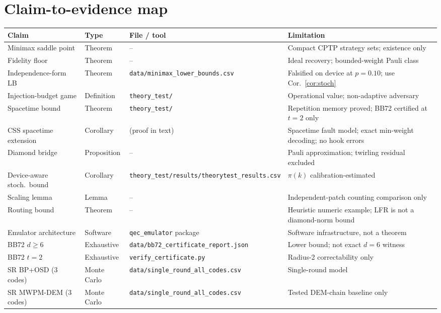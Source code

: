 \documentclass[11pt,a4paper]{article}
\begin{document}
\section*{Claim-to-evidence map}
\begin{table}[H]\centering\scriptsize
\setlength{\tabcolsep}{3pt}
\renewcommand{\arraystretch}{1.08}
\begin{tabularx}{\textwidth}{@{}p{3.1cm}p{1.7cm}X p{2.9cm}@{}}
\toprule Claim & Type & File / tool & Limitation \\\midrule
Minimax saddle point & Theorem & -- & Compact CPTP strategy sets; existence only \\
Fidelity floor & Theorem & -- & Ideal recovery; bounded-weight Pauli class \\
Independence-form LB & Theorem & \texttt{data/minimax\_lower\_bounds.csv} & Falsified on device at $p{=}0.10$; use Cor.~\ref{cor:stoch} \\
Injection-budget game & Definition & \texttt{theory\_test/} & Operational value; non-adaptive adversary \\
Spacetime bound & Theorem & \texttt{theory\_test/} & Repetition memory proved; BB72 certified at $t{=}2$ only \\
CSS spacetime extension & Corollary & (proof in text) & Spacetime fault model; exact min-weight decoding; no hook errors \\
Diamond bridge & Proposition & -- & Pauli approximation; twirling residual excluded \\
Device-aware stoch.\ bound & Corollary & \texttt{theory\_test/results/theorytest\_results.csv} & $\pi(k)$ calibration-estimated \\
Scaling lemma & Lemma & -- & Independent-patch counting comparison only \\
Routing bound & Theorem & -- & Heuristic numeric example; LFR is not a diamond-norm bound \\
Emulator architecture & Software & \texttt{qec\_emulator} package & Software infrastructure, not a theorem \\
BB72 $d\ge6$ & Exhaustive & \texttt{data/bb72\_certificate\_report.json} & Lower bound; not exact $d=6$ witness \\
BB72 $t=2$ & Exhaustive & \texttt{verify\_certificate.py} & Radius-2 correctability only \\
SR BP+OSD (3 codes) & Monte Carlo & \texttt{data/single\_round\_all\_codes.csv} & Single-round model \\
SR MWPM-DEM (3 codes) & Monte Carlo & \texttt{data/single\_round\_all\_codes.csv} & Tested DEM-chain baseline only \\

\end{tabularx}
\end{table}
\end{document}
